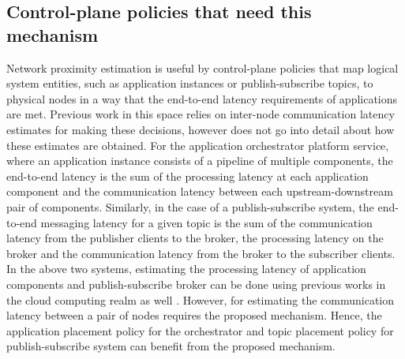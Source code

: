 \subsection{Control-plane policies that need this mechanism}
Network proximity estimation is useful by control-plane policies that map logical system entities, such as application instances or publish-subscribe topics, to physical nodes in a way that the end-to-end latency requirements of applications are met. Previous work in this space \cite{amarasinghe2018data,naas2017ifogstor,liu2019mobility} relies on inter-node communication latency estimates for making these decisions, however does not go into detail about how these estimates are obtained. For the application orchestrator platform service, where an application instance consists of a pipeline of multiple components, the end-to-end latency is the sum of the processing latency at each application component and the communication latency between each upstream-downstream pair of components. Similarly, in the case of a publish-subscribe system, the end-to-end messaging latency for a given topic is the sum of the communication latency from the publisher clients to the broker, the processing latency on the broker and the communication latency from the broker to the subscriber clients. In the above two systems, estimating the processing latency of application components and publish-subscribe broker can be done using previous works in the cloud computing realm as well \cite{khare2018scalable}. However, for estimating the communication latency between a pair of nodes requires the proposed mechanism. Hence, the application placement policy for the orchestrator and topic placement policy for publish-subscribe system can benefit from the proposed mechanism. 

